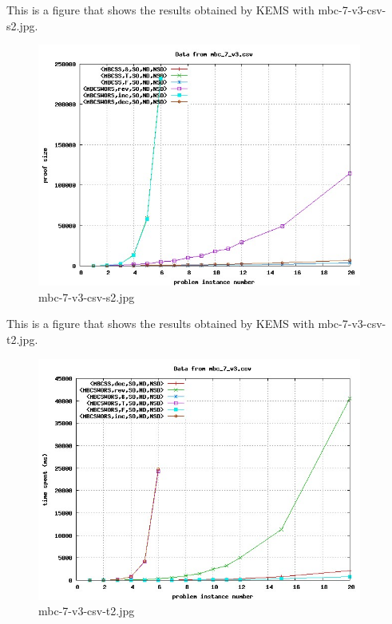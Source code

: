 This is a figure that shows the results obtained by KEMS with mbc-7-v3-csv-s2.jpg.
\begin{figure}[htbp]
\begin{center}
\includegraphics[width=0.95\textwidth]{figuras/mbc-7-v3-csv-s2.jpg}
\end{center}
\caption{mbc-7-v3-csv-s2.jpg}
\end{figure}

This is a figure that shows the results obtained by KEMS with mbc-7-v3-csv-t2.jpg.
\begin{figure}[htbp]
\begin{center}
\includegraphics[width=0.95\textwidth]{figuras/mbc-7-v3-csv-t2.jpg}
\end{center}
\caption{mbc-7-v3-csv-t2.jpg}
\end{figure}


